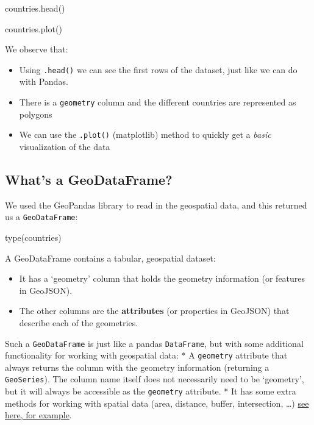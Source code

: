 \documentclass[
  letterpaper,
  DIV=11,
  numbers=noendperiod]{scrreprt}
\newenvironment{Shaded}{\begin{snugshade}}{\end{snugshade}}
\newcommand{\BuiltInTok}[1]{\textcolor[rgb]{0.00,0.23,0.31}{#1}}
\newcommand{\NormalTok}[1]{\textcolor[rgb]{0.00,0.23,0.31}{#1}}
\providecommand{\tightlist}{%
  \setlength{\itemsep}{0pt}\setlength{\parskip}{0pt}}\usepackage{longtable,booktabs,array}
\begin{document}
\begin{Shaded}
\begin{Highlighting}[]
\NormalTok{countries.head()}
\end{Highlighting}
\end{Shaded}

\begin{Shaded}
\begin{Highlighting}[]
\NormalTok{countries.plot()}
\end{Highlighting}
\end{Shaded}

We observe that:

\begin{itemize}
\tightlist
\item
  Using \texttt{.head()} we can see the first rows of the dataset, just
  like we can do with Pandas.
\item
  There is a \texttt{geometry} column and the different countries are
  represented as polygons
\item
  We can use the \texttt{.plot()} (matplotlib) method to quickly get a
  \emph{basic} visualization of the data
\end{itemize}

\hypertarget{whats-a-geodataframe}{%
\subsection{What's a GeoDataFrame?}\label{whats-a-geodataframe}}

We used the GeoPandas library to read in the geospatial data, and this
returned us a \texttt{GeoDataFrame}:

\begin{Shaded}
\begin{Highlighting}[]
\BuiltInTok{type}\NormalTok{(countries)}
\end{Highlighting}
\end{Shaded}

A GeoDataFrame contains a tabular, geospatial dataset:

\begin{itemize}
\tightlist
\item
  It has a `geometry' column that holds the geometry information (or
  features in GeoJSON).
\item
  The other columns are the \textbf{attributes} (or properties in
  GeoJSON) that describe each of the geometries.
\end{itemize}

Such a \texttt{GeoDataFrame} is just like a pandas \texttt{DataFrame},
but with some additional functionality for working with geospatial data:
* A \texttt{geometry} attribute that always returns the column with the
geometry information (returning a \texttt{GeoSeries}). The column name
itself does not necessarily need to be `geometry', but it will always be
accessible as the \texttt{geometry} attribute. * It has some extra
methods for working with spatial data (area, distance, buffer,
intersection, \ldots)
\href{https://github.com/jorisvandenbossche/geopandas-tutorial/blob/main/04-spatial-operations-overlays.ipynb}{see
here, for example}.
\end{document}
